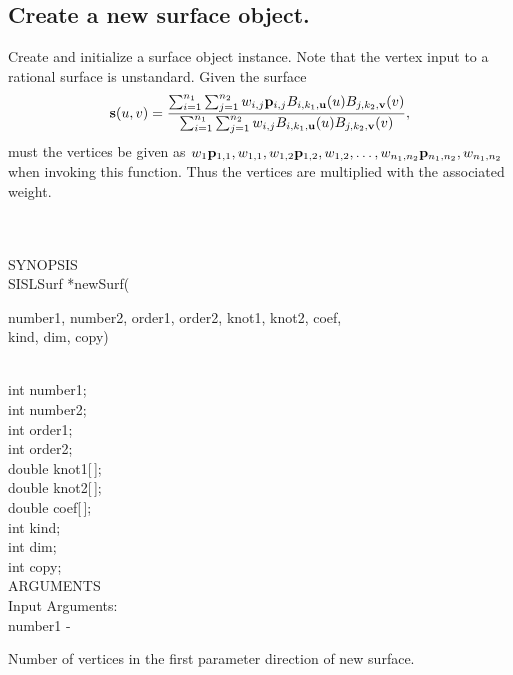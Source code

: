 \subsection{Create a new surface object.}\label{sec:newSurf}
\begin{minipg1}
Create and initialize a surface object instance. Note that the vertex input to a
  rational surface is unstandard. Given the surface
  $$
{\bf s}(u,v) = {\sum_{i=1}^{n_1}\sum_{j=1}^{n_2} w_{i,j} {\bf p}_{i,j} 
	    B_{i,k_1,{\bf u}}(u) B_{j,k_2,{\bf v}}(v)  \over
             \sum_{i=1}^{n_1}\sum_{j=1}^{n_2} w_{i,j}
	         B_{i,k_1,{\bf u}}(u) B_{j,k_2,{\bf v}}(v)},
$$
must the vertices be given as
${w_1  {\bf p}_{1,1}, w_{1,1}, w_{1,2}  {\bf p}_{1,2}, w_{1,2},  \ldots,
  w_{n_1,n_2}  {\bf p}_{n_1,n_2}, w_{n_1,n_2}}$ when invoking this function. Thus the vertices are multiplied with the
associated weight.
\end{minipg1} \\ \\
SYNOPSIS\\
        \>SISLSurf *newSurf(\begin{minipg3}
        {\fov number}1, {\fov number}2, {\fov order}1, {\fov order}2, {\fov knot}1, {\fov knot}2, {\fov coef},\\ {\fov kind}, {\fov dim}, {\fov copy})
                \end{minipg3}\\[0.3ex]
                \>\>    int    \>       {\fov number}1;\\
                \>\>    int    \>       {\fov number}2;\\
                \>\>    int    \>       {\fov order}1;\\
                \>\>    int    \>       {\fov order}2;\\
                \>\>    double \>       {\fov knot1}[\,];\\
                \>\>    double \>       {\fov knot2}[\,];\\
                \>\>    double \>       {\fov coef}[\,];\\
                \>\>    int    \>       {\fov kind};\\
                \>\>    int    \>       {\fov dim};\\
                \>\>    int    \>       {\fov copy};\\
ARGUMENTS\\
        \>Input Arguments:\\
        \>\>    {\fov number}1  \> - \> \begin{minipg2}
                        Number of vertices in the first parameter direction
                        of new surface.
                                \end{minipg2}\\[0.8ex]
